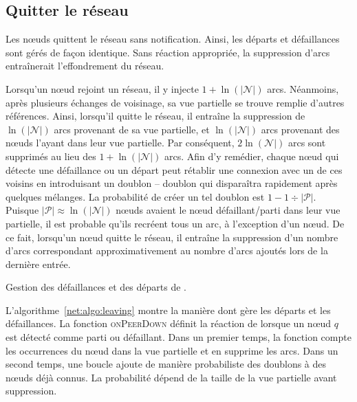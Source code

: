 \subsection{Quitter le réseau}
\label{net:subsec:leaving}

Les nœuds quittent le réseau sans notification. Ainsi, les départs et
défaillances sont gérés de façon identique. Sans réaction appropriée, la
suppression d'arcs entraînerait l'effondrement du réseau.

Lorsqu'un nœud rejoint un réseau, il y injecte $1+\ln(|\mathcal{N}|)$
arcs. Néanmoins, après plusieurs échanges de voisinage, sa vue partielle se
trouve remplie d'autres références. Ainsi, lorsqu'il quitte le réseau, il
entraîne la suppression de $\ln(|\mathcal{N}|)$ arcs provenant de sa vue
partielle, et $\ln(|\mathcal{N}|)$ arcs provenant des nœuds l'ayant dans leur
vue partielle. Par conséquent, $2\ln(\mathcal{N}|)$ arcs sont supprimés au lieu
des $1+\ln(|\mathcal{N}|)$ arcs. Afin d'y remédier, chaque nœud qui détecte une
défaillance ou un départ peut rétablir une connexion avec un de ces voisins en
introduisant un doublon -- doublon qui disparaîtra rapidement après quelques
mélanges. La probabilité de créer un tel doublon est
$1-1\div{|\mathcal{P}|}$. Puisque ${|\mathcal{P}|}\approx \ln(|\mathcal{N}|)$
nœuds avaient le nœud défaillant/parti dans leur vue partielle, il est probable
qu'ils recréent tous un arc, à l'exception d'un nœud. De ce fait, lorsqu'un nœud
quitte le réseau, il entraîne la suppression d'un nombre d'arcs correspondant
approximativement au nombre d'arcs ajoutés lors de la dernière entrée.

\begin{algorithm}[h]
  
  \caption[Gestion des défaillances et des départs de \SPRAY]
  {\label{net:algo:leaving}Gestion des défaillances et des départs de \SPRAY.}
\end{algorithm}

L'algorithme~\ref{net:algo:leaving} montre la manière dont \SPRAY gère les
départs et les défaillances. La fonction \textsc{onPeerDown} définit la réaction
de \SPRAY lorsque un nœud $q$ est détecté comme parti ou défaillant. Dans un
premier temps, la fonction compte les occurrences du nœud dans la vue partielle
et en supprime les arcs. Dans un second temps, une boucle ajoute de manière
probabiliste des doublons à des nœuds déjà connus. La probabilité dépend de la
taille de la vue partielle avant suppression.

